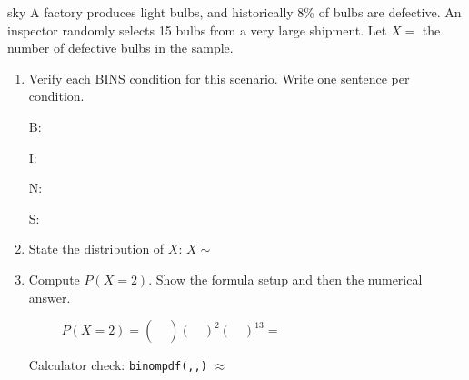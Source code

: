 \documentclass[10pt]{article}
\begin{document}
\namedateperiod

\vspace{0.14in}

\begin{scenariobox}[Context]{sky}
\small
A factory produces light bulbs, and historically 8\% of bulbs are defective.
An inspector randomly selects 15 bulbs from a very large shipment.
Let $X =$ the number of defective bulbs in the sample.
\end{scenariobox}

\vspace{0.1in}

\begin{practicebox}
\small
\begin{enumerate}[leftmargin=1.5em, itemsep=10pt]

  \item Verify each BINS condition for this scenario. Write one sentence per condition.

  \vspace{4pt}
  B: \writeline

  I: \writeline

  N: \writeline

  S: \writeline

  \item State the distribution of $X$: $X \sim$ \blank{4cm}

  \item Compute $P(X = 2)$. Show the formula setup and then the numerical answer.

  \[
    P(X = 2) = \binom{\quad}{\quad}(\quad)^2(\quad)^{13} = \hspace{5cm}
  \]

  \vspace{6pt}
  Calculator check: \texttt{binompdf(}\blank{1cm}\texttt{,}\;\blank{1cm}\texttt{,}\texttt{)} $\approx$ \blank{2cm}

\end{enumerate}
\end{practicebox}
\end{document}
